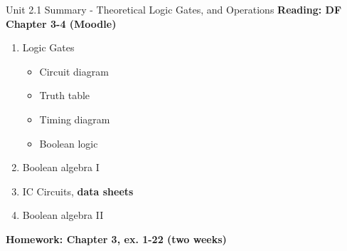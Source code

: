\documentclass{beamer}
\begin{document}
\begin{frame}{Unit 2.1 Summary - Theoretical Logic Gates, and Operations}
\textbf{Reading: DF Chapter 3-4 (Moodle)}
\begin{enumerate}
\item Logic Gates
\begin{itemize}
\item Circuit diagram
\item Truth table
\item Timing diagram
\item Boolean logic
\end{itemize}
\item \alert{Boolean algebra I}
\item IC Circuits, \textbf{data sheets}
\item \alert{Boolean algebra II}
\end{enumerate}
\textbf{Homework: Chapter 3, ex. 1-22 (two weeks)}
\end{frame}
\end{document}

